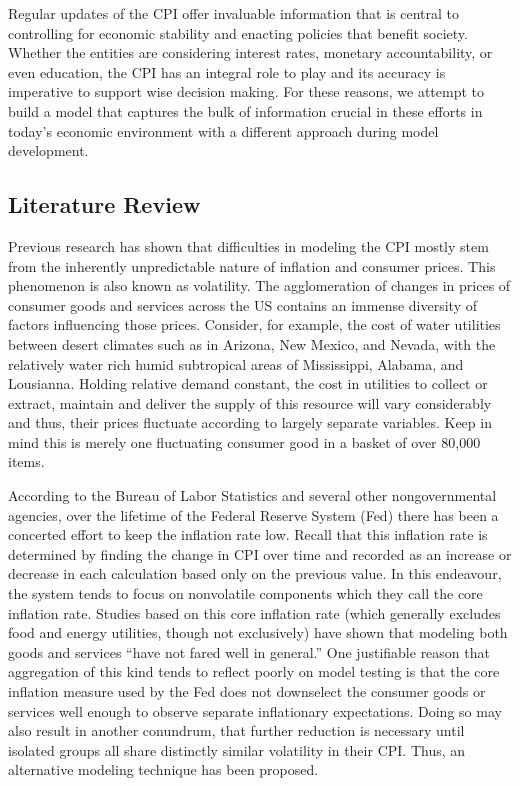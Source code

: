 \documentclass[
]{article}
\begin{document}
Regular updates of the CPI offer invaluable information that is central
to controlling for economic stability and enacting policies that benefit
society. Whether the entities are considering interest rates, monetary
accountability, or even education, the CPI has an integral role to play
and its accuracy is imperative to support wise decision making. For
these reasons, we attempt to build a model that captures the bulk of
information crucial in these efforts in today's economic environment
with a different approach during model development.

\hypertarget{literature-review}{%
\subsection{Literature Review}\label{literature-review}}

Previous research has shown that difficulties in modeling the CPI mostly
stem from the inherently unpredictable nature of inflation and consumer
prices. This phenomenon is also known as volatility. The agglomeration
of changes in prices of consumer goods and services across the US
contains an immense diversity of factors influencing those prices.
Consider, for example, the cost of water utilities between desert
climates such as in Arizona, New Mexico, and Nevada, with the relatively
water rich humid subtropical areas of Mississippi, Alabama, and
Lousianna. Holding relative demand constant, the cost in utilities to
collect or extract, maintain and deliver the supply of this resource
will vary considerably and thus, their prices fluctuate according to
largely separate variables. Keep in mind this is merely one fluctuating
consumer good in a basket of over 80,000 items.

According to the Bureau of Labor Statistics and several other
nongovernmental agencies, over the lifetime of the Federal Reserve
System (Fed) there has been a concerted effort to keep the inflation
rate low. Recall that this inflation rate is determined by finding the
change in CPI over time and recorded as an increase or decrease in each
calculation based only on the previous value. In this endeavour, the
system tends to focus on nonvolatile components which they call the core
inflation rate. Studies based on this core inflation rate (which
generally excludes food and energy utilities, though not exclusively)
have shown that modeling both goods and services ``have not fared well
in general.'' One justifiable reason that aggregation of this kind tends
to reflect poorly on model testing is that the core inflation measure
used by the Fed does not downselect the consumer goods or services well
enough to observe separate inflationary expectations. Doing so may also
result in another conundrum, that further reduction is necessary until
isolated groups all share distinctly similar volatility in their CPI.
Thus, an alternative modeling technique has been proposed.
\end{document}

